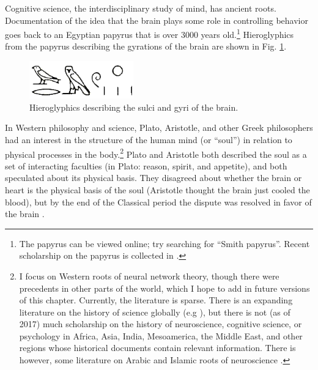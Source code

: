 Cognitive science, the interdisciplinary study of mind, has ancient roots. Documentation of the idea that the brain plays some role in controlling behavior goes back to an Egyptian papyrus that is over 3000 years old.\footnote{The papyrus can be viewed online; try searching for ``Smith papyrus''. Recent scholarship on the papyrus is collected in \cite{meltzer2014edwin}.} Hieroglyphics from the papyrus describing the gyrations of the brain are shown in Fig. \ref{papyrus}. 

\begin{figure}[h]
\centering
\includegraphics[width=0.4\textwidth]{images/papyrus.png}
\caption[From \url{https://faculty.washington.edu/chudler/papy.html}]{Hieroglyphics describing the sulci and gyri of the brain.}
\label{papyrus}
\end{figure}

In Western philosophy and science, Plato, Aristotle, and other Greek philosophers had an interest in the structure of the human mind (or ``soul'') in relation to physical processes in the body.\footnote{I focus on Western roots of neural network theory, though there were precedents in other parts of the world, which I hope to add in future versions of this chapter. Currently, the literature is sparse. There is an expanding literature on the history of science globally (e.g \cite{selin2013encyclopaedia}), but there is not (as of 2017) much scholarship on the history of neuroscience, cognitive science, or psychology in Africa, Asia, India, Mesoamerica, the Middle East, and other regions whose historical documents contain relevant information. There is however, some literature on  Arabic and Islamic roots of neuroscience \cite{mohamed2008arab}.}  Plato and Aristotle both described the soul as a set of interacting faculties (in Plato: reason, spirit, and appetite), and both speculated about its physical basis. They disagreed  about whether the brain or heart is the physical basis of the soul (Aristotle thought the brain just cooled the blood), but by the end of the Classical period the dispute was resolved in favor of the brain \cite{finger2001origins}.

